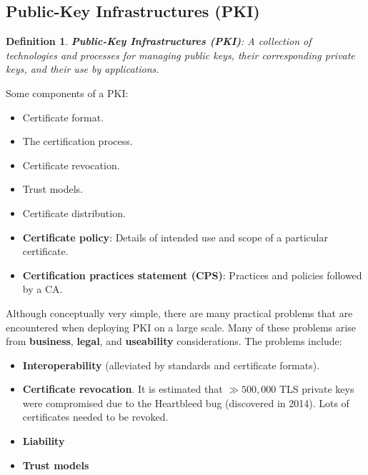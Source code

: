 \documentclass[12pt,titlepage]{article}
\newtheorem{protodefinition}[prototheorem]{Definition}
\newenvironment{definition}
{\colorlet{shadecolor}{cyan!15}\begin{shaded}\begin{protodefinition}\normalfont}{\end{protodefinition}\end{shaded}}
\begin{document}
\subsection{Public-Key Infrastructures (PKI)}
\begin{definition}
	\textbf{Public-Key Infrastructures (PKI)}: A collection of technologies and processes for managing public keys, their corresponding private keys, and their use by applications.
\end{definition}
Some components of a PKI:\begin{itemize}
	\item Certificate format.
	\item The certification process.
	\item Certificate revocation.
	\item Trust models.
	\item Certificate distribution.
	\item \textbf{Certificate policy}: Details of intended use and scope of a particular certificate.
	\item \textbf{Certification practices statement (CPS)}: Practices and policies followed by a CA.
\end{itemize}
Although conceptually very simple, there are many practical problems that are encountered when deploying PKI on a large scale. Many of these problems arise from \textbf{business}, \textbf{legal}, and \textbf{useability} considerations.
The problems include:\begin{itemize}
	\item \textbf{Interoperability} (alleviated by standards and certificate formats).
	\item \textbf{Certificate revocation}. It is estimated that $\gg 500,000$ TLS private keys were compromised due to the Heartbleed bug (discovered in 2014). Lots of certificates needed to be revoked.
	\item \textbf{Liability}
	\item \textbf{Trust models}
\end{itemize}
\end{document}
